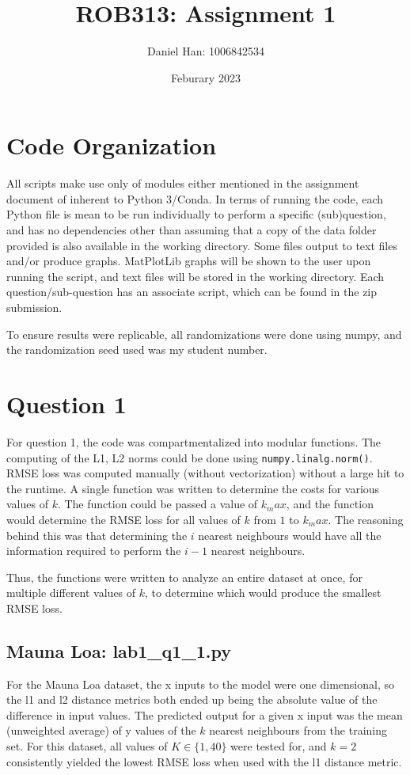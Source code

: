 \documentclass{article}
\title{ROB313: Assignment 1}
\author{Daniel Han: 1006842534}
\date{Feburary 2023}
\begin{document}
\maketitle

\section*{Code Organization}
All scripts make use only of modules either mentioned in the assignment document of inherent to Python 3/Conda. In terms of running the code, each Python file is mean to be run individually to perform a specific (sub)question, and has no dependencies other than assuming that a copy of the data folder provided is also available in the working directory. Some files output to text files and/or produce graphs. MatPlotLib graphs will be shown to the user upon running the script, and text files will be stored in the working directory. Each question/sub-question has an associate script, which can be found in the zip submission.

To ensure results were replicable, all randomizations were done using numpy, and the randomization seed used was my student number.

\section{Question 1}
For question 1, the code was compartmentalized into modular functions. The computing of the L1, L2 norms could be done using \texttt{numpy.linalg.norm()}. RMSE loss was computed manually (without vectorization) without a large hit to the runtime. A single function was written to determine the costs for various values of $k$. The function could be passed a value of $k_max$, and the function would determine the RMSE loss for all values of $k$ from $1$ to $k_max$. The reasoning behind this was that determining the $i$ nearest neighbours would have all the information required to perform the $i-1$ nearest neighbours.

Thus, the functions were written to analyze an entire dataset at once, for multiple different values of $k$, to determine which would produce the smallest RMSE loss.

\subsection{Mauna Loa: lab1\_q1\_1.py}

For the Mauna Loa dataset, the x inputs to the model were one dimensional, so the l1 and l2 distance metrics both ended up being the absolute value of the difference in input values. The predicted output for a given x input was the mean (unweighted average) of y values of the $k$ nearest neighbours from the training set. For this dataset, all values of $K \in \{1, 40\}$ were tested for, and $k=2$ consistently yielded the lowest RMSE loss when used with the l1 distance metric.
\end{document}
